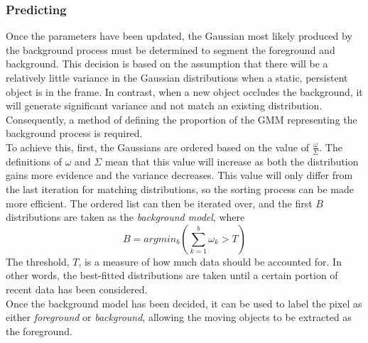 \subsubsection{Predicting}
\setlength{\leftskip}{0.5cm}
\indent \indent
Once the parameters have been updated, the Gaussian most likely produced by the background process must be determined to segment the foreground and background. This decision is based on the assumption that there will be a relatively little variance in the Gaussian distributions when a static, persistent object is in the frame. In contrast, when a new object occludes the background, it will generate significant variance and not match an existing distribution. Consequently, a method of defining the proportion of the GMM representing the background process is required.
\smallskip \\ \indent
To achieve this, first, the Gaussians are ordered based on the value of $\frac{\omega}{\Sigma}$. The definitions of $\omega$ and $\Sigma$ mean that this value will increase as both the distribution gains more evidence and the variance decreases. This value will only differ from the last iteration for matching distributions, so the sorting process can be made more efficient. The ordered list can then be iterated over, and the first $B$ distributions are taken as the \textit{background model}, where
\begin{equation}
    B = argmin_b \left( \sum^b_{k=1} \omega_k > T \right)
\end{equation}
The threshold, $T$, is a measure of how much data should be accounted for. In other words, the best-fitted distributions are taken until a certain portion of recent data has been considered. 
\smallskip \\ \indent
Once the background model has been decided, it can be used to label the pixel as either \textit{foreground} or \textit{background}, allowing the moving objects to be extracted as the foreground.

\setlength{\leftskip}{0cm}
